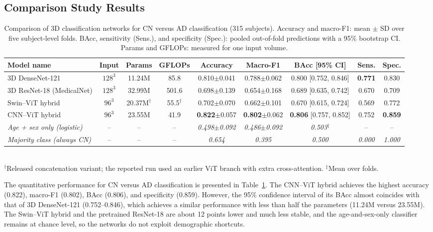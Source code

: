 \documentclass[conference,a4paper]{IEEEtran}
\begin{document}
\subsection{Comparison Study Results}
\begin{table}[t]
\centering
\caption{Comparison of 3D classification networks for CN versus AD classification (315 subjects). Accuracy and macro-F1: mean $\pm$ SD over five subject-level folds. BAcc, sensitivity (Sens.), and specificity (Spec.): pooled out-of-fold predictions with a 95\% bootstrap CI. Params and GFLOPs: measured for one input volume.}
\label{tab:binary}
\setlength{\tabcolsep}{4.5pt}
\begin{tabular}{lcccccccc}
\toprule
Model name & Input & Params & GFLOPs & Accuracy & Macro-F1 & BAcc [95\% CI] & Sens. & Spec. \\
\midrule
3D DenseNet-121 & $128^3$ & 11.24M & 85.8 & 0.810$\pm$0.041 & 0.788$\pm$0.062 & 0.800 [0.752, 0.846] & \textbf{0.771} & 0.830 \\
3D ResNet-18 (MedicalNet) & $128^3$ & 32.99M & 501.6 & 0.698$\pm$0.139 & 0.654$\pm$0.168 & 0.689 [0.635, 0.742] & 0.670 & 0.709 \\
Swin--ViT hybrid & $96^3$ & 20.37M$^{\dagger}$ & 55.5$^{\dagger}$ & 0.702$\pm$0.070 & 0.662$\pm$0.101 & 0.670 [0.615, 0.724] & 0.569 & 0.772 \\
CNN--ViT hybrid & $96^3$ & 23.55M & 41.9 & \textbf{0.822}$\pm$0.057 & \textbf{0.802}$\pm$0.062 & \textbf{0.806} [0.757, 0.852] & 0.752 & \textbf{0.859} \\
\midrule
\textit{Age + sex only (logistic)} & -- & -- & -- & \textit{0.498}$\pm$\textit{0.092} & \textit{0.486}$\pm$\textit{0.092} & \textit{0.503}$^{\ddagger}$ & -- & -- \\
\textit{Majority class (always CN)} & -- & -- & -- & \textit{0.654} & \textit{0.395} & \textit{0.500} & \textit{0.000} & \textit{1.000} \\
\bottomrule
\end{tabular}
\\[2pt]{\scriptsize $^{\dagger}$Released concatenation variant; the reported run used an earlier ViT branch with extra cross-attention. $^{\ddagger}$Mean over folds.}
\end{table}

The quantitative performance for CN versus AD classification is presented in Table~\ref{tab:binary}. The CNN--ViT hybrid achieves the highest accuracy (0.822), macro-F1 (0.802), BAcc (0.806), and specificity (0.859). However, the 95\% confidence interval of its BAcc almost coincides with that of 3D DenseNet-121 (0.752--0.846), which achieves a similar performance with less than half the parameters (11.24M versus 23.55M). The Swin--ViT hybrid and the pretrained ResNet-18 are about 12 points lower and much less stable, and the age-and-sex-only classifier remains at chance level, so the networks do not exploit demographic shortcuts.
\end{document}
